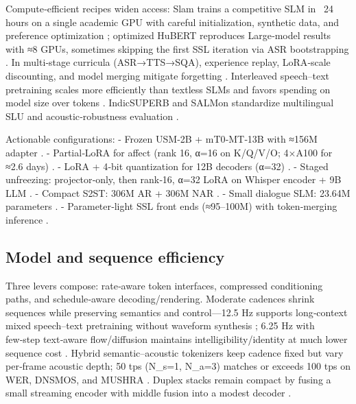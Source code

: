 Compute‑efficient recipes widen access: Slam trains a competitive SLM in ~24 hours on a single academic GPU with careful initialization, synthetic data, and preference optimization \cite{maimon2025slammingtrainingspeechlanguagemodelonegp}; optimized HuBERT reproduces Large‑model results with ≈8 GPUs, sometimes skipping the first SSL iteration via ASR bootstrapping \cite{chen2023reducingbarriersselfsupervisedlearninghu}. In multi‑stage curricula (ASR→TTS→SQA), experience replay, LoRA‑scale discounting, and model merging mitigate forgetting \cite{hsiao2025analyzingmitigationstrategiescatastrophi}. Interleaved speech–text pretraining scales more efficiently than textless SLMs and favors spending on model size over tokens \cite{maimon2025scalinganalysisinterleavedspeechtextlang}. IndicSUPERB and SALMon standardize multilingual SLU and acoustic‑robustness evaluation \cite{entry2025indicsuperbspeechprocessinguniversalperf,maimon2025salmonsuiteacousticlanguagemodelevaluati}.

Actionable configurations:
- Frozen USM‑2B + mT0‑MT‑13B with ≈156M adapter \cite{wang2023slmbridgethingapbetweenspeechtextfoundat}.
- Partial‑LoRA for affect (rank 16, α=16 on K/Q/V/O; 4×A100 for ≈2.6 days) \cite{wang2024blspemotowardsempatheticlargespeechlangu}.
- LoRA + 4‑bit quantization for 12B decoders (α=32) \cite{nguyen2025qwenvsgemmaintegrationwhispercomparative}.
- Staged unfreezing: projector‑only, then rank‑16, α=32 LoRA on Whisper encoder + 9B LLM \cite{li2025seewossubmissionmlcslmlessonslearnedspee}.
- Compact S2ST: 306M AR + 306M NAR \cite{peng2024mslms2stmultitaskspeechlanguagemodeltext}.
- Small dialogue SLM: 23.64M parameters \cite{nakata2024jchatjapaneselargescalespokendialoguecor}.
- Parameter‑light SSL front ends (≈95–100M) with token‑merging inference \cite{chen2023reducingbarriersselfsupervisedlearninghu,lu2024fastadaspmultitaskadaptedefficientinfere,maimon2025scalinganalysisinterleavedspeechtextlang}.

\subsection{Model and sequence efficiency} \label{subsec:Model and sequence efficiency}
Three levers compose: rate‑aware token interfaces, compressed conditioning paths, and schedule‑aware decoding/rendering. Moderate cadences shrink sequences while preserving semantics and control—12.5 Hz supports long‑context mixed speech–text pretraining without waveform synthesis \cite{zeng2024scalingspeechtextpretrainingsyntheticint}; 6.25 Hz with few‑step text‑aware flow/diffusion maintains intelligibility/identity at much lower sequence cost \cite{wang2025tadicodectextawarediffusionspeechtokeniz}. Hybrid semantic–acoustic tokenizers keep cadence fixed but vary per‑frame acoustic depth; 50 tps (N_s=1, N_a=3) matches or exceeds 100 tps on WER, DNSMOS, and MUSHRA \cite{yang2025diffsoundstreamefficientspeechtokenizati}. Duplex stacks remain compact by fusing a small streaming encoder with middle fusion into a modest decoder \cite{ma2024languagemodelcanlistenwhilespeaking}.

